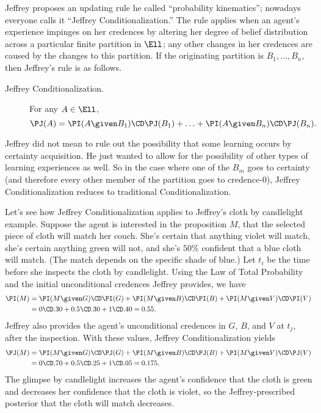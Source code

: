 Jeffrey proposes an updating rule he called ``probability kinematics''; nowadays everyone calls it ``Jeffrey Conditionalization.'' The rule applies when an agent's experience impinges on her credences by altering her degree of belief distribution across a particular finite partition in $\Ell$; any other changes in her credences are caused by the changes to this partition. If the originating partition is $B_1, \ldots, B_n$, then Jeffrey's rule is as follows.
\begin{description}
\item[Jeffrey Conditionalization.\,]{For any $A \in \Ell$, $$\PJ(A)=\PI(A \given B_1) \CD \PJ(B_1) + \ldots + \PI(A \given B_n) \CD \PJ(B_n).$$}
\end{description}
Jeffrey did not mean to rule out the possibility that some learning occurs by certainty acquisition. He just wanted to allow for the possibility of other types of learning experiences as well. So in the case where one of the $B_m$ goes to certainty (and therefore every other member of the partition goes to credence-$0$), Jeffrey Conditionalization reduces to traditional Conditionalization.

Let's see how Jeffrey Conditionalization applies to Jeffrey's cloth by candlelight example. Suppose the agent is interested in the proposition $M$, that the selected piece of cloth will match her couch.  She's certain that anything violet will match, she's certain anything green will not, and she's $50\%$ confident that a blue cloth will match. (The match depends on the specific shade of blue.) Let $t_i$ be the time before she inspects the cloth by candlelight. Using the Law of Total Probability and the initial unconditional credences Jeffrey provides, we have
\begin{equation}
\begin{split}
\PI(M) &= \PI(M \given G) \CD \PI(G) + \PI(M \given B) \CD \PI(B) + \PI(M \given V) \CD \PI(V) \\
		&= 0 \CD .30 + 0.5 \CD .30 + 1 \CD .40 = 0.55.
\end{split}
\end{equation}
Jeffrey also provides the agent's unconditional credences in $G$, $B$, and $V$ at $t_j$, after the inspection. With these values, Jeffrey Conditionalization yields
\begin{equation}
\begin{split}
\PJ(M) &= \PI(M \given G) \CD \PJ(G) + \PI(M \given B) \CD \PJ(B) + \PI(M \given V) \CD \PJ(V) \\
		&= 0 \CD .70 + 0.5 \CD .25 + 1 \CD .05 = 0.175.
\end{split}
\end{equation}
The glimpse by candlelight increases the agent's confidence that the cloth is green and decreases her confidence that the cloth is violet, so the Jeffrey-prescribed posterior that the cloth will match decreases.


